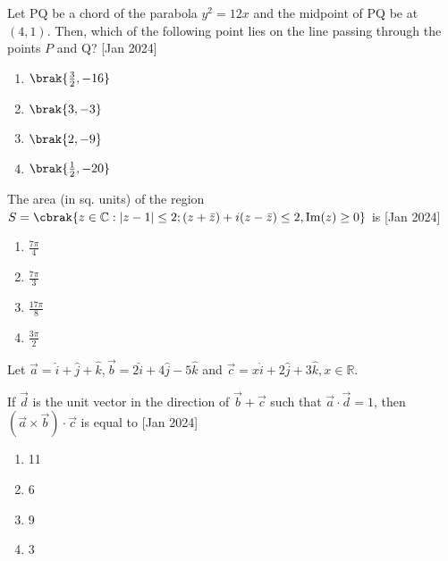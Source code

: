    \item{
    		
    		Let PQ be a chord of the parabola $y^{2}=12 x$ and the midpoint of PQ be at $(4,1)$. Then, which of the following point lies on the line passing through the points $P$ and Q?
             \hfill
                {[Jan 2024]}
			\begin{multicols}{4}
				\begin{enumerate}
					\item $\brak{\frac{3}{2},-16}$
					\item $\brak{3,-3}$
					\item $\brak{2,-9}$
					\item $\brak{\frac{1}{2},-20}$
				\end{enumerate}
			\end{multicols}
        
        }
    \item{
        	
        	The area (in sq. units) of the region $S=\cbrak{z \in \mathbb{C}:|z-1| \leq 2 ;(z+\bar{z})+i(z-\bar{z}) \leq 2, \operatorname{Im}(z) \geq 0}$ is\hfill
                {[Jan 2024]}
				\begin{multicols}{4}
	                \begin{enumerate}
	                	\item $\frac{7 \pi}{4}$
	                	\item $\frac{7 \pi}{3}$
	                	\item $\frac{17 \pi}{8}$
	                	\item $\frac{3 \pi}{2}$
	                \end{enumerate}
				\end{multicols}
        
        }
 \item{
    	
	    	Let $\vec{a}=\hat{i}+\hat{j}+\hat{k}, \vec{b}=2 \hat{i}+4 \hat{j}-5 \hat{k}$ and $\vec{c}=x \hat{i}+2 \hat{j}+3 \hat{k}, x \in \mathbb{R}$.
	    	
	    	If $\vec{d}$ is the unit vector in the direction of $\vec{b}+\vec{c}$ such that $\vec{a} \cdot \vec{d}=1$, then $(\vec{a} \times \vec{b}) \cdot \vec{c}$ is equal to
	    	\text{   }\hfill
	    	{[Jan 2024]}
	    	\begin{multicols}{4}
	    		\begin{enumerate}
	    			\item 11
	    			\item 6
	    			\item 9
	    			\item 3
	    		\end{enumerate}
	    	\end{multicols}
	    	
	    }
